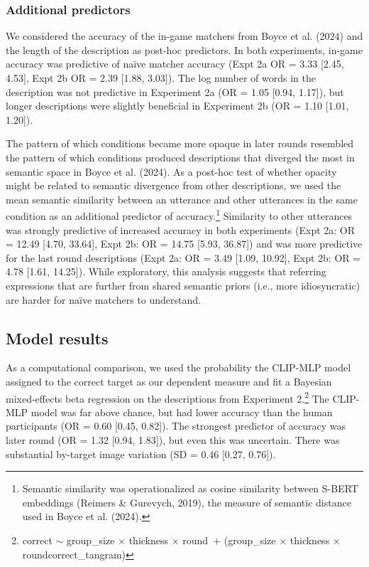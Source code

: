 \documentclass[10pt, letterpaper]{article}
\begin{document}
\subsubsection{Additional predictors}\label{additional-predictors}

We considered the accuracy of the in-game matchers from Boyce et al.
(2024) and the length of the description as post-hoc predictors. In both
experiments, in-game accuracy was predictive of naïve matcher accuracy
(Expt 2a OR = 3.33 {[}2.45, 4.53{]}, Expt 2b OR = 2.39 {[}1.88,
3.03{]}). The log number of words in the description was not predictive
in Experiment 2a (OR = 1.05 {[}0.94, 1.17{]}), but longer descriptions
were slightly beneficial in Experiment 2b (OR = 1.10 {[}1.01, 1.20{]}).

The pattern of which conditions became more opaque in later rounds
resembled the pattern of which conditions produced descriptions that
diverged the most in semantic space in Boyce et al. (2024). As a
post-hoc test of whether opacity might be related to semantic divergence
from other descriptions, we used the mean semantic similarity between an
utterance and other utterances in the same condition as an additional
predictor of accuracy.\footnote{Semantic similarity was operationalized
  as cosine similarity between S-BERT embeddings (Reimers \& Gurevych,
  2019), the measure of semantic distance used in Boyce et al. (2024).}
Similarity to other utterances was strongly predictive of increased
accuracy in both experiments (Expt 2a: OR = 12.49 {[}4.70, 33.64{]},
Expt 2b: OR = 14.75 {[}5.93, 36.87{]}) and was more predictive for the
last round descriptions (Expt 2a: OR = 3.49 {[}1.09, 10.92{]}, Expt 2b:
OR = 4.78 {[}1.61, 14.25{]}). While exploratory, this analysis suggests
that referring expressions that are further from shared semantic priors
(i.e., more idiosyncratic) are harder for naïve matchers to understand.

\subsection{Model results}\label{model-results}

As a computational comparison, we used the probability the CLIP-MLP
model assigned to the correct target as our dependent measure and fit a
Bayesian mixed-effects beta regression on the descriptions from
Experiment 2.\footnote{correct \({\sim}\) group\_size \({\times}\)
  thickness \({\times}\) round~\({+}\) (group\_size \({\times}\)
  thickness \({\times}\) round\textbar correct\_tangram)} The CLIP-MLP
model was far above chance, but had lower accuracy than the human
participants (OR = 0.60 {[}0.45, 0.82{]}). The strongest predictor of
accuracy was later round (OR = 1.32 {[}0.94, 1.83{]}), but even this was
uncertain. There was substantial by-target image variation (SD = 0.46
{[}0.27, 0.76{]}).
\end{document}
